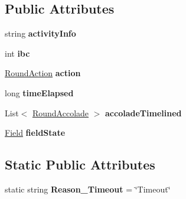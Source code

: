 \subsection*{Public Attributes}
\begin{DoxyCompactItemize}
\item 
\hypertarget{class_m_b_c_1_1_core_1_1_round_log_1_1_round_activity_a93245160332d9eba203f366e9f6c7b40}{string {\bfseries activity\-Info}}\label{class_m_b_c_1_1_core_1_1_round_log_1_1_round_activity_a93245160332d9eba203f366e9f6c7b40}

\item 
\hypertarget{class_m_b_c_1_1_core_1_1_round_log_1_1_round_activity_a9621add554c3937e5dd83b64d6783ebd}{int {\bfseries ibc}}\label{class_m_b_c_1_1_core_1_1_round_log_1_1_round_activity_a9621add554c3937e5dd83b64d6783ebd}

\item 
\hypertarget{class_m_b_c_1_1_core_1_1_round_log_1_1_round_activity_af5aa39bdbfc08d5d91d1e78778169390}{\hyperlink{class_m_b_c_1_1_core_1_1_round_log_af3f9f76d90fb391108dd1eaeaeae27e4}{Round\-Action} {\bfseries action}}\label{class_m_b_c_1_1_core_1_1_round_log_1_1_round_activity_af5aa39bdbfc08d5d91d1e78778169390}

\item 
\hypertarget{class_m_b_c_1_1_core_1_1_round_log_1_1_round_activity_a41e76ac7f84c694a03a2d6deae2dd2e5}{long {\bfseries time\-Elapsed}}\label{class_m_b_c_1_1_core_1_1_round_log_1_1_round_activity_a41e76ac7f84c694a03a2d6deae2dd2e5}

\item 
\hypertarget{class_m_b_c_1_1_core_1_1_round_log_1_1_round_activity_ac8200bb672e193945d5cac7ad3bcfd5c}{List$<$ \hyperlink{class_m_b_c_1_1_core_1_1_round_log_a4060830ca7135aa755ec5b6d24aa30e6}{Round\-Accolade} $>$ {\bfseries accolade\-Timelined}}\label{class_m_b_c_1_1_core_1_1_round_log_1_1_round_activity_ac8200bb672e193945d5cac7ad3bcfd5c}

\item 
\hypertarget{class_m_b_c_1_1_core_1_1_round_log_1_1_round_activity_a007bff7b101c4416edae38eaa7590c71}{\hyperlink{class_m_b_c_1_1_core_1_1_field}{Field} {\bfseries field\-State}}\label{class_m_b_c_1_1_core_1_1_round_log_1_1_round_activity_a007bff7b101c4416edae38eaa7590c71}

\end{DoxyCompactItemize}
\subsection*{Static Public Attributes}
\begin{DoxyCompactItemize}
\item 
\hypertarget{class_m_b_c_1_1_core_1_1_round_log_1_1_round_activity_af8458e6721eb85d6155a1fc5d81beb6d}{static string {\bfseries Reason\-\_\-\-Timeout} = \char`\"{}Timeout\char`\"{}}\label{class_m_b_c_1_1_core_1_1_round_log_1_1_round_activity_af8458e6721eb85d6155a1fc5d81beb6d}

\end{DoxyCompactItemize}



